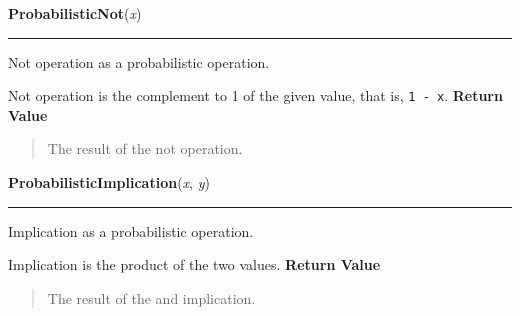     \label{peach:fuzzy:norms:ProbabilisticNot}

    \vspace{0.5ex}

\hspace{.8\funcindent}\begin{boxedminipage}{\funcwidth}

    \raggedright \textbf{ProbabilisticNot}(\textit{x})

    \vspace{-1.5ex}

    \rule{\textwidth}{0.5\fboxrule}
\setlength{\parskip}{2ex}

Not operation as a probabilistic operation.

Not operation is the complement to 1 of the given value, that is, \texttt{1 - x}.
\setlength{\parskip}{1ex}
      \textbf{Return Value}
    \vspace{-1ex}

      \begin{quote}

The result of the not operation.
      \end{quote}

    \end{boxedminipage}

    \label{peach:fuzzy:norms:ProbabilisticImplication}

    \vspace{0.5ex}

\hspace{.8\funcindent}\begin{boxedminipage}{\funcwidth}

    \raggedright \textbf{ProbabilisticImplication}(\textit{x}, \textit{y})

    \vspace{-1.5ex}

    \rule{\textwidth}{0.5\fboxrule}
\setlength{\parskip}{2ex}

Implication as a probabilistic operation.

Implication is the product of the two values.
\setlength{\parskip}{1ex}
      \textbf{Return Value}
    \vspace{-1ex}

      \begin{quote}

The result of the and implication.
      \end{quote}

    \end{boxedminipage}

